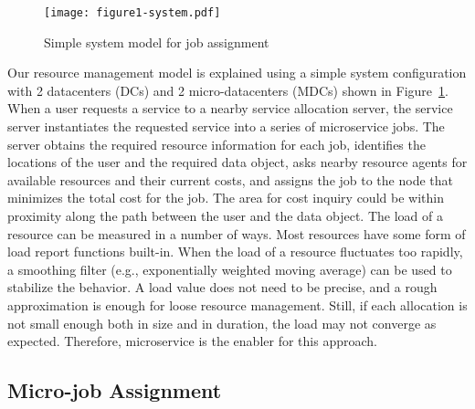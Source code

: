 
\begin{figure}[tb]
  \begin{center}
    \texttt{[image: figure1-system.pdf]}
    \vspace{-2.0ex}
    \caption{Simple system model for job assignment}
    \label{fig:system}
  \end{center}
\end{figure}

Our resource management model is explained using a simple system
configuration with 2 datacenters (DCs) and 2 micro-datacenters (MDCs)
shown in Figure~\ref{fig:system}.
When a user requests a service to a nearby service allocation server,
the service server instantiates the requested service into a series of
microservice jobs.
The server obtains the required resource information for each job,
identifies the locations of the user and the required data object,
asks nearby resource agents for available resources and their current costs,
and assigns the job to the node that minimizes the total cost for the
job.
The area for cost inquiry could be within proximity along the path
between the user and the data object.
The load of a resource can be measured in a number of ways.  Most
resources have some form of load report functions built-in.
When the load of a resource fluctuates too rapidly,
a smoothing filter (e.g., exponentially weighted moving average)
can be used to stabilize the behavior.
A load value does not need to be precise, and a rough approximation is
enough for loose resource management.
Still, if each allocation is not small enough both in size and in
duration, the load may not converge as expected.
Therefore, microservice is the enabler for this approach.

\subsection{Micro-job Assignment}

